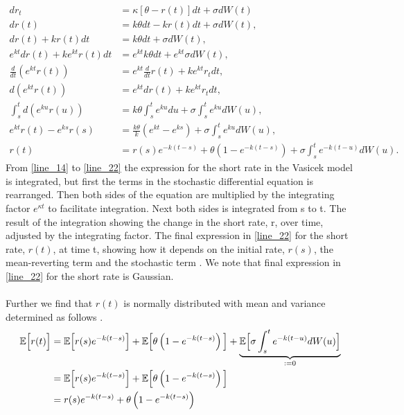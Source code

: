 \begin{align}
    d r_t &= \kappa \left[\theta - r(t)\right] dt + \sigma d W(t) \label{line_14} \\
    d r(t) &= k \theta dt - k r(t) dt + \sigma d W(t),  \\
    d r(t) + k r(t) dt &= k \theta dt + \sigma d W(t), \\
    e^{kt} d r(t) + k e^{kt} r(t) dt &= e^{kt} k \theta dt + e^{kt} \sigma d W(t), \\
    \frac{d}{dt} \left( e^{k t} r(t) \right) &= e^{k t} \frac{d}{dt} r(t) + k e^{k t} r_t dt, \\
    d\left( e^{k t} r(t) \right) &= e^{k t} dr(t) + k e^{k t} r_t dt, \\
    \int_s^t d \left( e^{ku} r(u) \right) &= k \theta \int_s^t e^{ku} du + \sigma \int_s^t e^{ku} d W(u), \\
    e^{kt} r(t) - e^{k s} r(s) &= \frac{k \theta}{k} \left( e^{kt} - e^{ks} \right) + \sigma \int_s^t e^{ku} d W(u), \\
    r(t) &= r(s) e^{-k(t-s)} + \theta \left( 1 - e^{-k(t-s)} \right) + \sigma \int_s^t e^{-k(t-u)} d W(u). \label{line_22}
\end{align}
From \autoref{line_14} to \autoref{line_22} the expression for the short rate in the Vasicek model is integrated, 
but first the terms in the stochastic differential equation is rearranged.
Then both sides of the equation are multiplied by the 
integrating factor $e^{\kappa t}$ to facilitate integration. Next both sides is integrated from s to t. The result of the
integration showing the change in the short  rate, r, over time, adjusted by the integrating factor. The final 
expression in \autoref{line_22} for the short rate, $r(t)$, at time t, showing how it depends on the initial rate, $r(s)$,
the mean-reverting term and the stochastic term \cite{Bermudan}. We note that  final expression in \autoref{line_22} for the short rate
is Gaussian.
\\\\
Further we find that $r(t)$ is normally distributed with mean and variance determined as follows \cite{Bjork}. 
\begin{align*}
    \mathbb{E} \Big[r(t)\Big] & = \mathbb{E} \Big[ r(s) e^{-k(t-s)} \Big] + \mathbb{E} \Big[\theta \left( 1 - e^{-k(t-s)} \right)\Big]
    + \underset{:=0}{\underbrace{\mathbb{E} \Big[\sigma \int_s^t e^{-k(t-u)} d W(u)\Big] }}\\
    & = \mathbb{E} \Big[ r(s) e^{-k(t-s)} \Big] + \mathbb{E} \Big[\theta \left( 1 - e^{-k(t-s)} \right)\Big] \\
    & = r(s) e^{-k(t-s)} + \theta \left( 1 - e^{-k(t-s)} \right) 
\end{align*}    
